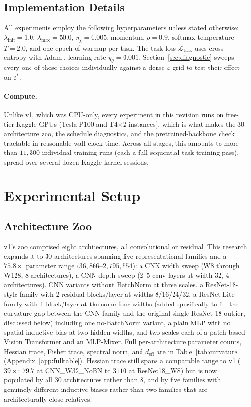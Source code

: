 \documentclass[11pt]{article}
\newcommand{\eps}{\varepsilon}
\newcommand{\epsstar}{\eps^{*}}
\begin{document}
\subsection{Implementation Details}
All experiments employ the following hyperparameters unless stated otherwise:
$\lambda_{\mathrm{init}}=1.0$, $\lambda_{\max}=50.0$, $\eta_\lambda = 0.005$,
momentum $\rho=0.9$, softmax temperature $T=2.0$, and one epoch of warmup per
task. The task loss $\mathcal{L}_{\mathrm{task}}$ uses cross-entropy with
Adam \citep{kingma2014adam}, learning rate $\eta_\theta = 0.001$.
Section~\ref{sec:diagnostic} sweeps every one of these choices individually
against a dense $\eps$ grid to test their effect on $\epsstar$.

\paragraph{Compute.} Unlike v1, which was CPU-only, every experiment in
this revision runs on free-tier Kaggle GPUs (Tesla P100 and T4$\times$2
instances), which is what makes the 30-architecture zoo, the schedule
diagnostics, and the pretrained-backbone check tractable in reasonable
wall-clock time. Across all stages, this amounts to more than $11{,}300$
individual training runs (each a full sequential-task training pass),
spread over several dozen Kaggle kernel sessions.

\section{Experimental Setup}
\label{sec:setup}

\subsection{Architecture Zoo}
v1's zoo comprised eight architectures, all convolutional or residual. This research
expands it to 30 architectures spanning five representational families and a
$75.8\times$ parameter range ($36{,}866$--$2{,}795{,}554$): a CNN width sweep
(W8 through W128, 8 architectures), a CNN depth sweep (2--5 conv layers at
width 32, 4 architectures), CNN variants without BatchNorm at three scales,
a ResNet-18-style family with 2 residual blocks/layer at widths 8/16/24/32,
a ResNet-Lite family with 1 block/layer at the same four widths (added
specifically to fill the curvature gap between the CNN family and the
original single ResNet-18 outlier, discussed below) including one no-BatchNorm
variant, a plain MLP with no spatial inductive bias at two hidden widths,
and two scales each of a patch-based Vision Transformer and an MLP-Mixer.
Full per-architecture parameter counts, Hessian trace, Fisher trace,
spectral norm, and $d_{\mathrm{eff}}$ are in Table~\ref{tab:curvature}
(Appendix~\ref{app:fulltable}). Hessian trace still spans a comparable range
to v1 ($39\times$: $79.7$ at CNN\_W32\_NoBN to $3110$ at ResNet18\_W8) but is
now populated by all 30 architectures rather than 8, and by five families
with genuinely different inductive biases rather than two families that are
architecturally close relatives.
\end{document}
